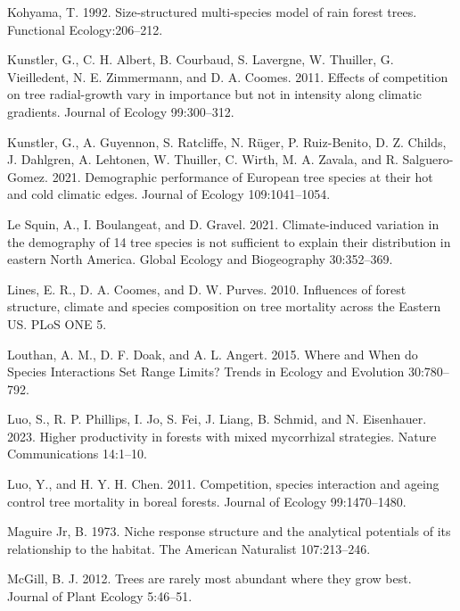 \documentclass[12pt]{article}
\newlength{\cslhangindent}
\newenvironment{cslreferences}%
  {\setlength{\parindent}{0pt}%
  \everypar{\setlength{\hangindent}{\cslhangindent}}\ignorespaces}%
  {\par}
\begin{document}
\begin{cslreferences}
\leavevmode\hypertarget{ref-kohyama1992}{}%
Kohyama, T. 1992. Size-structured multi-species model of rain forest
trees. Functional Ecology:206--212.

\leavevmode\hypertarget{ref-Kunstler2011a}{}%
Kunstler, G., C. H. Albert, B. Courbaud, S. Lavergne, W. Thuiller, G.
Vieilledent, N. E. Zimmermann, and D. A. Coomes. 2011. Effects of
competition on tree radial-growth vary in importance but not in
intensity along climatic gradients. Journal of Ecology 99:300--312.

\leavevmode\hypertarget{ref-Kunstler2021}{}%
Kunstler, G., A. Guyennon, S. Ratcliffe, N. Rüger, P. Ruiz-Benito, D. Z.
Childs, J. Dahlgren, A. Lehtonen, W. Thuiller, C. Wirth, M. A. Zavala,
and R. Salguero-Gomez. 2021. Demographic performance of European tree
species at their hot and cold climatic edges. Journal of Ecology
109:1041--1054.

\leavevmode\hypertarget{ref-LeSquin2021}{}%
Le Squin, A., I. Boulangeat, and D. Gravel. 2021. Climate-induced
variation in the demography of 14 tree species is not sufficient to
explain their distribution in eastern North America. Global Ecology and
Biogeography 30:352--369.

\leavevmode\hypertarget{ref-Lines2010}{}%
Lines, E. R., D. A. Coomes, and D. W. Purves. 2010. Influences of forest
structure, climate and species composition on tree mortality across the
Eastern US. PLoS ONE 5.

\leavevmode\hypertarget{ref-Louthan2015}{}%
Louthan, A. M., D. F. Doak, and A. L. Angert. 2015. Where and When do
Species Interactions Set Range Limits? Trends in Ecology and Evolution
30:780--792.

\leavevmode\hypertarget{ref-Luo2023}{}%
Luo, S., R. P. Phillips, I. Jo, S. Fei, J. Liang, B. Schmid, and N.
Eisenhauer. 2023. Higher productivity in forests with mixed mycorrhizal
strategies. Nature Communications 14:1--10.

\leavevmode\hypertarget{ref-Luo2011}{}%
Luo, Y., and H. Y. H. Chen. 2011. Competition, species interaction and
ageing control tree mortality in boreal forests. Journal of Ecology
99:1470--1480.

\leavevmode\hypertarget{ref-maguire1973niche}{}%
Maguire Jr, B. 1973. Niche response structure and the analytical
potentials of its relationship to the habitat. The American Naturalist
107:213--246.

\leavevmode\hypertarget{ref-McGill2012}{}%
McGill, B. J. 2012. Trees are rarely most abundant where they grow best.
Journal of Plant Ecology 5:46--51.


\end{cslreferences}
\end{document}
